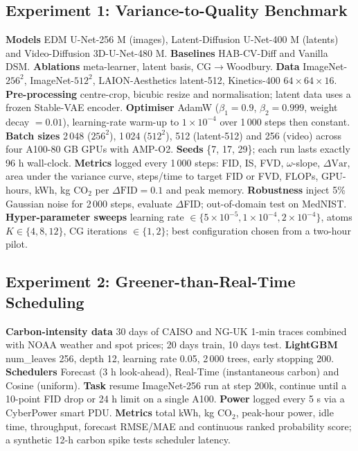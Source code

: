 \documentclass{article}
\begin{document}
\subsection{Experiment 1: Variance-to-Quality Benchmark}
\textbf{Models} EDM U-Net-256 M (images), Latent-Diffusion U-Net-400 M (latents) and Video-Diffusion 3D-U-Net-480 M. \textbf{Baselines} HAB-CV-Diff and Vanilla DSM. \textbf{Ablations} \textminus meta-learner, \textminus latent basis, CG$\rightarrow$Woodbury. \textbf{Data} ImageNet-$256^2$, ImageNet-$512^2$, LAION-Aesthetics latent-512, Kinetics-400 $64\times 64\times 16$. \textbf{Pre-processing} centre-crop, bicubic resize and normalisation; latent data uses a frozen Stable-VAE encoder. \textbf{Optimiser} AdamW ($\beta_{1}=0.9$, $\beta_{2}=0.999$, weight decay $=0.01$), learning-rate warm-up to $1\times 10^{-4}$ over 1\,000 steps then constant. \textbf{Batch sizes} 2\,048 ($256^2$), 1\,024 ($512^2$), 512 (latent-512) and 256 (video) across four A100-80 GB GPUs with AMP-O2. \textbf{Seeds} \{7, 17, 29\}; each run lasts exactly 96 h wall-clock. \textbf{Metrics} logged every 1\,000 steps: FID, IS, FVD, $\omega$-slope, $\Delta\mathrm{Var}$, area under the variance curve, steps/time to target FID or FVD, FLOPs, GPU-hours, kWh, kg CO$_2$ per $\Delta\mathrm{FID}=0.1$ and peak memory. \textbf{Robustness} inject 5\% Gaussian noise for 2\,000 steps, evaluate $\Delta$FID; out-of-domain test on MedNIST. \textbf{Hyper-parameter sweeps} learning rate $\in \{5\times 10^{-5}, 1\times 10^{-4}, 2\times 10^{-4}\}$, atoms $K \in \{4, 8, 12\}$, CG iterations $\in \{1, 2\}$; best configuration chosen from a two-hour pilot.

\subsection{Experiment 2: Greener-than-Real-Time Scheduling}
\textbf{Carbon-intensity data} 30 days of CAISO and NG-UK 1-min traces combined with NOAA weather and spot prices; 20 days train, 10 days test. \textbf{LightGBM} num\_leaves 256, depth 12, learning rate 0.05, 2\,000 trees, early stopping 200. \textbf{Schedulers} Forecast (3 h look-ahead), Real-Time (instantaneous carbon) and Cosine (uniform). \textbf{Task} resume ImageNet-256 run at step 200k, continue until a 10-point FID drop or 24 h limit on a single A100. \textbf{Power} logged every 5 s via a CyberPower smart PDU. \textbf{Metrics} total kWh, kg CO$_2$, peak-hour power, idle time, throughput, forecast RMSE/MAE and continuous ranked probability score; a synthetic 12-h carbon spike tests scheduler latency.
\end{document}
